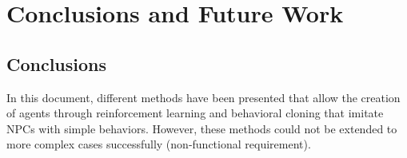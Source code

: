 %
%
%

\chapter{Conclusions and Future Work}

\minitoc{}

\bigskip{}

\section{Conclusions}

In this document, different methods have been presented that allow the creation of agents through reinforcement learning and behavioral cloning that imitate NPCs with simple behaviors. However, these methods could not be extended to more complex cases successfully (non-functional requirement).

